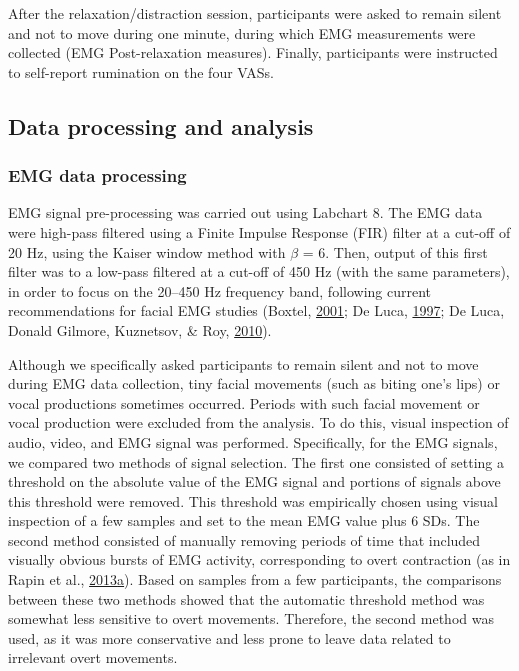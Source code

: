 \documentclass[a4paper,12pt,twoside,openright,oldfontcommands]{memoir}
\begin{document}
After the relaxation/distraction session, participants were asked to remain silent and not to move during one minute, during which EMG measurements were collected (EMG Post-relaxation measures). Finally, participants were instructed to self-report rumination on the four VASs.

\hypertarget{data-processing-and-analysis}{%
\subsection{Data processing and analysis}\label{data-processing-and-analysis}}

\hypertarget{emg-data-processing}{%
\subsubsection{EMG data processing}\label{emg-data-processing}}

EMG signal pre-processing was carried out using Labchart 8. The EMG data were high-pass filtered using a Finite Impulse Response (FIR) filter at a cut-off of 20 Hz, using the Kaiser window method with \(\beta\) = 6. Then, output of this first filter was to a low-pass filtered at a cut-off of 450 Hz (with the same parameters), in order to focus on the 20--450 Hz frequency band, following current recommendations for facial EMG studies (Boxtel, \protect\hyperlink{ref-boxtel_optimal_2001}{2001}; De Luca, \protect\hyperlink{ref-de_luca_use_1997}{1997}; De Luca, Donald Gilmore, Kuznetsov, \& Roy, \protect\hyperlink{ref-de_luca_filtering_2010}{2010}).

Although we specifically asked participants to remain silent and not to move during EMG data collection, tiny facial movements (such as biting one's lips) or vocal productions sometimes occurred. Periods with such facial movement or vocal production were excluded from the analysis. To do this, visual inspection of audio, video, and EMG signal was performed. Specifically, for the EMG signals, we compared two methods of signal selection. The first one consisted of setting a threshold on the absolute value of the EMG signal and portions of signals above this threshold were removed. This threshold was empirically chosen using visual inspection of a few samples and set to the mean EMG value plus 6 SDs. The second method consisted of manually removing periods of time that included visually obvious bursts of EMG activity, corresponding to overt contraction (as in Rapin et al., \protect\hyperlink{ref-rapin_emg_2013}{2013}\protect\hyperlink{ref-rapin_emg_2013}{a}). Based on samples from a few participants, the comparisons between these two methods showed that the automatic threshold method was somewhat less sensitive to overt movements. Therefore, the second method was used, as it was more conservative and less prone to leave data related to irrelevant overt movements.
\end{document}
